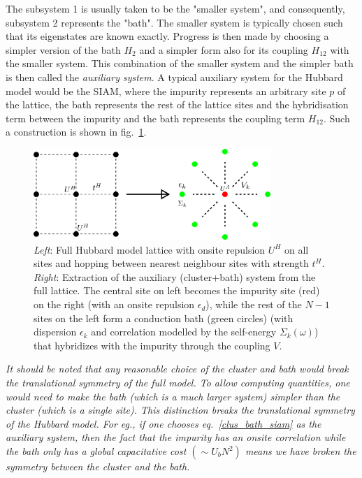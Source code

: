 \documentclass{report}
\numberwithin{equation}{section}
\begin{document}
The subsystem 1 is usually taken to be the "smaller system", and consequently, subsystem 2 represents the "bath".
The smaller system is typically chosen such that its eigenstates are known exactly.
Progress is then made by choosing a simpler version of the bath \(H_2\) and a simpler form also for its coupling \(H_{12}\) with the smaller system.
This combination of the smaller system and the simpler bath is then called the \textit{auxiliary system}.
A typical auxiliary system for the Hubbard model would be the SIAM, where the impurity represents an arbitrary site \(p\) of the lattice, the bath represents the rest of the lattice sites and the hybridisation term between the impurity and the bath represents the coupling term \(H_{12}\).
Such a construction is shown in fig.~\ref{cluster-bath}.
\begin{figure}[htpb!]
	\centering
	\includegraphics[width=0.8\textwidth]{../figures/cluster-bath.png}
	\caption{\textit{Left}: Full Hubbard model lattice with onsite repulsion $U^H$ on all sites and hopping between nearest neighbour sites with strength $t^H$. \textit{Right}: Extraction of the auxiliary (cluster+bath) system from the full lattice. The central site on left becomes the impurity site (red) on the right (with an onsite repulsion $\epsilon_d$), while the rest of the $N-1$ sites on the left form a conduction bath (green circles) (with dispersion $\epsilon_k$ and correlation modelled by the self-energy $\Sigma_k(\omega)$) that hybridizes with the impurity through the coupling $V$.}
	\label{cluster-bath}
\end{figure}
\textit{It should be noted that any reasonable choice of the cluster and bath would break the translational symmetry of the full model. To allow computing quantities, one would need to make the bath (which is a much larger system) simpler than the cluster (which is a single site). This distinction breaks the translational symmetry of the Hubbard model. For eg., if one chooses eq.~\ref{clus_bath_siam} as the auxiliary system, then the fact that the impurity has an onsite correlation while the bath only has a global capacitative cost $(\sim U_b N^2)$ means we have broken the symmetry between the cluster and the bath.}
\end{document}
